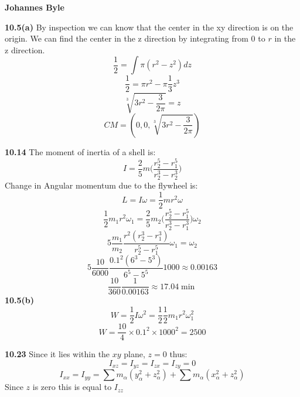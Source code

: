 \documentclass[english]{article}
\begin{document}
\begin{multicols*}{2}
\textbf{Johannes Byle}\\
\newcommand{\Lagr}{\mathcal{L}}

\noindent
\textbf{10.5(a)}
By inspection we can know that the center in the xy direction is on the origin. We can find the center in the z direction by integrating from $0$ to $r$ in the z direction.
$$\frac{1}{2}=\int \pi(r^2-z^2)dz$$
$$\frac{1}{2}=\pi r^2-\pi\frac{1}{3}z^3$$
$$\sqrt[3]{3r^2-\frac{3}{2\pi}}=z$$
$$CM=(0,0,\sqrt[3]{3r^2-\frac{3}{2\pi}})$$

\noindent
\textbf{10.14}
The moment of inertia of a shell is:
$$I=\frac{2}{5}m\Big(\frac{r_2^5-r_1^5}{r_2^3-r_2^3}\Big)$$
Change in Angular momentum due to the flywheel is:
$$L=I\omega=\frac{1}{2}mr^2\omega$$
$$\frac{1}{2}m_1r^2\omega_1=\frac{2}{5}m_2\Big(\frac{r_2^5-r_1^5}{r_2^3-r_1^3}\Big)\omega_2$$
$$5\frac{m_1}{m_2}\frac{r^2(r_2^3-r_1^3)}{r_2^5-r_1^5}\omega_1=\omega_2$$
$$5\frac{10}{6000}\frac{0.1^2(6^3-5^3)}{6^5-5^5}1000\approx0.00163$$
$$\frac{10}{360}\frac{1}{0.00163}\approx17.04\min$$
\textbf{10.5(b)}
$$W=\frac{1}{2}I\omega^2=\frac{1}{2}\frac{1}{2}m_1r^2\omega_1^2$$
$$W=\frac{10}{4}\times0.1^2\times1000^2=2500$$

\noindent
\textbf{10.23}
Since it lies within the $xy$ plane, $z=0$ thus:
$$I_{xz}=I_{yz}=I_{zx}=I_{zy}=0$$
$$I_{xx}=I_{yy}=\sum m_\alpha(y_\alpha^2+z_\alpha^2)+\sum m_\alpha(x_\alpha^2+z_\alpha^2)$$
Since $z$ is zero this is equal to $I_{zz}$
\end{multicols*}
\end{document}

